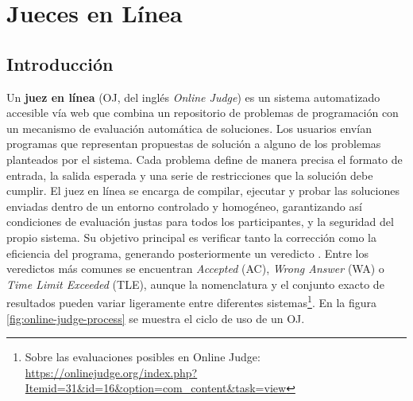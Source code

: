 \chapter{Jueces en Línea}
\label{cap:estadoDelArteDeJuecesEnLinea}

\section{Introducción}

Un \textbf{juez en línea} (OJ, del inglés \textit{Online Judge}) es un sistema automatizado accesible vía web que combina un repositorio de problemas de programación con un mecanismo de evaluación automática de soluciones. Los usuarios envían programas que representan propuestas de solución a alguno de los problemas planteados por el sistema. Cada problema define de manera precisa el formato de entrada, la salida esperada y una serie de restricciones que la solución debe cumplir. El juez en línea se encarga de compilar, ejecutar y probar las soluciones enviadas dentro de un entorno controlado y homogéneo, garantizando así condiciones de evaluación justas para todos los participantes, y la seguridad del propio sistema. Su objetivo principal es verificar tanto la corrección como la eficiencia del programa, generando posteriormente un veredicto \citep{Watanobe_Rahman_Matsumoto_Rage_Ravikumar_2022, Wasik_Antczak_Badura_Laskowski_Sternal_2019}. Entre los veredictos más comunes se encuentran \textit{Accepted} (AC), \textit{Wrong Answer} (WA) o \textit{Time Limit Exceeded} (TLE), aunque la nomenclatura y el conjunto exacto de resultados pueden variar ligeramente entre diferentes sistemas\footnote{Sobre las evaluaciones posibles en Online Judge: \url{https://onlinejudge.org/index.php?Itemid=31&id=16&option=com_content&task=view}}. En la figura \ref{fig:online-judge-process} se muestra el ciclo de uso de un OJ.

